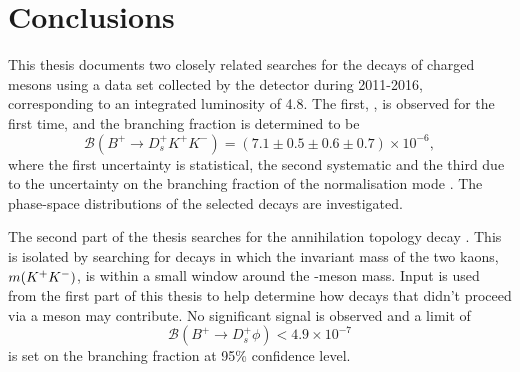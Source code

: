 \chapter{Conclusions}
\label{ch:conclusion}

This thesis documents two closely related searches for the decays of charged \B mesons using a data set collected by the \lhcb detector during 2011-2016, corresponding to an integrated luminosity of 4.8\invfb.
The first, \decay{\Bp}{\Dsp\Kp\Km}, is observed for the first time, and the branching fraction is determined to be  
\begin{equation*}
\mathcal{B}(B^{+} \to D_s^{+}K^{+}K^{-} ) = (7.1 \pm 0.5 \pm 0.6 \pm 0.7) \times 10^{-6}, 
\end{equation*}
\noindent where the first uncertainty is statistical, the second systematic and the third due to the uncertainty on 
the branching fraction of the normalisation mode \decay{\Bp}{\Dsp\Dzb}.
The phase-space distributions of the selected \decay{\Bp}{\Dsp\Kp\Km} decays are investigated. 

The second part of the thesis searches for the annihilation topology decay \decay{\Bp}{\Dsp\phiz}. This is isolated by searching for decays in which the invariant mass of the two kaons, $m({{K}^+}{{K}^-})$, is within a small window around the \phiz-meson mass. Input is used from the first part of this thesis to help determine how \decay{\Bp}{\Dsp\Kp\Km} decays that didn't proceed via a \phiz meson may contribute. No significant \decay{\Bp}{\Dsp\phiz} signal is observed and a limit of
\begin{equation*}
\mathcal{B}(B^{+} \to D_s^{+}\phi) < 4.9 \times 10^{-7}
\end{equation*}
is set on the branching fraction at 95\% confidence level.



